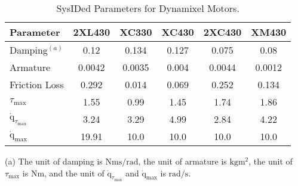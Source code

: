 \begin{table}[t]
\centering
\caption{SysIDed Parameters for Dynamixel Motors.}
\setlength{\tabcolsep}{6pt}
\begin{threeparttable}
\begin{tabular}{lccccc}
\toprule
\textbf{Parameter}       & \textbf{2XL430} & \textbf{XC330} & \textbf{XC430} & \textbf{2XC430} & \textbf{XM430} \\ 
\midrule
Damping$^{(a)}$                 & 0.12           & 0.134          & 0.127          & 0.075           & 0.08          \\ 
Armature                 & 0.0042         & 0.0035         & 0.004          & 0.0044          & 0.0012        \\ 
Friction Loss            & 0.292          & 0.014          & 0.069          & 0.252           & 0.134         \\ 
${\tau}_{\max}$            & 1.55           & 0.99           & 1.45           & 1.74            & 1.86          \\ 
${\dot{\mathrm{q}}}_{{\tau}_{\max}}$  & 3.24           & 3.29           & 4.99           & 2.84            & 4.22          \\ 
${\dot{\mathrm{q}}}_{\max}$         & 19.91          & 10.0           & 10.0           & 10.0            & 10.0          \\ 
\bottomrule
\end{tabular}

\begin{tablenotes}
\item[{(a)}] The unit of damping is $\mathrm{Nms/rad}$, the unit of armature is $\mathrm{kgm^2}$, the unit of ${\tau}_{\max}$ is $\mathrm{Nm}$, and the unit of ${\dot{\mathrm{q}}}_{{\tau}_{\max}}$ and ${\dot{\mathrm{q}}}_{\max}$ is $\mathrm{rad/s}$.
\end{tablenotes}

\end{threeparttable}

\label{tab:motor_parameters}
\vspace{-3mm}
\end{table}
